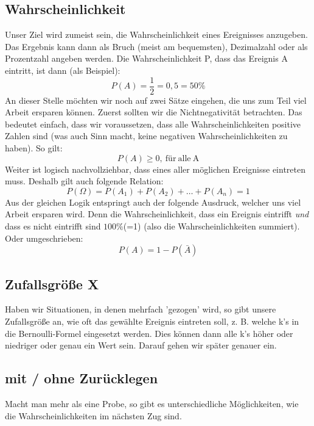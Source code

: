	\subsection{Wahrscheinlichkeit}
		Unser Ziel wird zumeist sein, die Wahrscheinlichkeit eines Ereignisses
		anzugeben. Das Ergebnis kann dann als Bruch (meist am bequemsten), Dezimalzahl
		oder als Prozentzahl angeben werden. Die Wahrscheinlichkeit P, dass das
		Ereignis A eintritt, ist dann (als Beispiel):
		\[P(A)=\frac{1}{2}=0,5=50\%\]
		An dieser Stelle möchten wir noch auf zwei Sätze eingehen, die uns zum Teil
		viel Arbeit ersparen können. Zuerst sollten wir die Nichtnegativität
		betrachten. Das bedeutet einfach, dass wir voraussetzen, dass alle
		Wahrscheinlichkeiten positive Zahlen sind (was auch Sinn macht, keine
		negativen Wahrscheinlichkeiten zu haben). So gilt:
		\[P(A)\geq 0 \mathrm{,\ für\ alle\ A}\]
		Weiter ist logisch nachvollziehbar, dass eines aller möglichen Ereignisse
		eintreten muss. Deshalb gilt auch folgende Relation:
		\[P(\Omega)=P(A_1)+P(A_2)+ \ldots+ P(A_n)=1\]
		Aus der gleichen Logik entspringt auch der folgende Ausdruck, welcher uns viel
		Arbeit ersparen wird. Denn die Wahrscheinlichkeit, dass ein Ereignis eintrifft
		\emph{und} dass es nicht eintrifft sind \(100\%\)(=1) (also die
		Wahrscheinlichkeiten summiert). Oder umgeschrieben:
		\[P(A)=1-P(\bar{A})\]

	\subsection{Zufallsgröße X}
		Haben wir Situationen, in denen mehrfach 'gezogen' wird, so gibt unsere
		Zufallsgröße an, wie oft das gewählte Ereignis eintreten soll, z. B. welche
		k's in die Bernoulli-Formel eingesetzt werden. Dies können dann alle k's höher
		oder niedriger oder genau ein Wert sein. Darauf gehen wir später genauer ein.

	\subsection{mit / ohne Zurücklegen}
		Macht man mehr als eine Probe, so gibt es unterschiedliche Möglichkeiten, wie
		die Wahrscheinlichkeiten im nächsten Zug sind.\\
		
